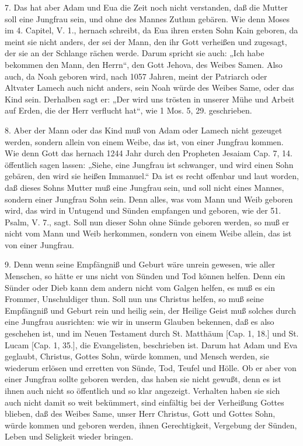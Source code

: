 7. Das hat aber Adam und Eua die Zeit noch nicht verstanden, daß die Mutter soll eine Jungfrau sein, und ohne des Mannes Zuthun gebären. Wie denn Moses im 4. Capitel, V. 1., hernach schreibt, da Eua ihren ersten Sohn Kain geboren, da meint sie nicht anders, der sei der Mann, den ihr Gott verheißen und zugesagt, der sie an der Schlange rächen werde. Darum spricht sie auch: „Ich habe bekommen den Mann, den Herrn“, den Gott Jehova, des Weibes Samen. Also auch, da Noah geboren wird, nach 1057 Jahren, meint der Patriarch oder Altvater Lamech auch nicht anders, sein Noah würde des Weibes Same, oder das Kind sein. Derhalben sagt er: „Der wird uns trösten in unserer Mühe und Arbeit auf Erden, die der Herr verflucht hat“, wie 1 Mos. 5, 29. geschrieben.

8. Aber der Mann oder das Kind muß von Adam oder Lamech nicht gezeuget werden, sondern allein von einem Weibe, das ist, von einer Jungfrau kommen. Wie denn Gott das hernach 1244 Jahr durch den Propheten Jesaiam Cap. 7, 14. öffentlich sagen lassen: „Siehe, eine Jungfrau ist schwanger, und wird einen Sohn gebären, den wird sie heißen Immanuel.“ Da ist es recht offenbar und laut worden, daß dieses
Sohns Mutter muß eine Jungfrau sein, und soll nicht eines Mannes, sondern einer Jungfrau Sohn sein. Denn alles, was vom Mann und Weib geboren wird, das wird in Untugend und Sünden empfangen und geboren, wie der 51. Psalm, V. 7., sagt. Soll nun dieser Sohn ohne Sünde geboren werden, so muß er nicht vom Mann und Weib herkommen, sondern von einem Weibe allein, das ist von einer Jungfrau.

9. Denn wenn seine Empfängniß und Geburt wäre unrein gewesen, wie aller Menschen, so hätte er uns nicht von Sünden und Tod können helfen. Denn ein Sünder oder Dieb kann dem andern nicht vom Galgen helfen, es muß es ein Frommer, Unschuldiger thun. Soll nun uns Christus helfen, so muß seine Empfängniß und Geburt rein und heilig sein, der Heilige Geist muß solches durch eine Jungfrau ausrichten: wie wir in unserm Glauben bekennen, daß es also geschehen ist, und im Neuen Testament durch St. Matthäum [Cap. 1, 18.] und St. Lucam [Cap. 1, 35.], die Evangelisten, beschrieben ist. Darum hat Adam und Eva geglaubt, Christus, Gottes Sohn, würde kommen, und Mensch werden, sie wiederum erlösen und erretten von Sünde, Tod, Teufel und Hölle. Ob er aber von einer Jungfrau sollte geboren werden, das haben sie nicht gewußt, denn es ist ihnen auch nicht so öffentlich und so klar angezeigt. Verhalten haben sie sich auch nicht damit so weit bekümmert, sind einfältig bei der Verheißung Gottes blieben, daß des Weibes Same, unser Herr Christus, Gott und Gottes Sohn, würde kommen und geboren werden, ihnen Gerechtigkeit, Vergebung der Sünden, Leben und Seligkeit wieder bringen.

